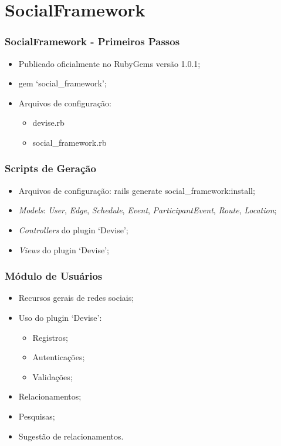 \documentclass{beamer}
\begin{document}
\section{SocialFramework}

\begin{frame}
\frametitle{SocialFramework - Primeiros Passos}

\begin{itemize}
	\item Publicado oficialmente no RubyGems versão 1.0.1;
	\item gem `social\_framework';
	\item Arquivos de configuração:
	\begin{itemize}
		\item devise.rb
		\item social\_framework.rb
	\end{itemize}
\end{itemize}

\end{frame}

\begin{frame}
\frametitle{Scripts de Geração}

\begin{itemize}
	\item Arquivos de configuração: rails generate social\_framework:install;
	\item \textit{Models}: \textit{User}, \textit{Edge}, \textit{Schedule}, \textit{Event}, \textit{ParticipantEvent}, \textit{Route}, \textit{Location};
	\item \textit{Controllers} do plugin `Devise';
	\item \textit{Views} do plugin `Devise';
\end{itemize}

\end{frame}

\begin{frame}
\frametitle{Módulo de Usuários}

\begin{itemize}
	\item Recursos gerais de redes sociais;
	\item Uso do plugin `Devise':
	\begin{itemize}
		\item Registros;
		\item Autenticações;
		\item Validações;
	\end{itemize}
	\item Relacionamentos;
	\item Pesquisas;
	\item Sugestão de relacionamentos.
\end{itemize}

\end{frame}
\end{document}
